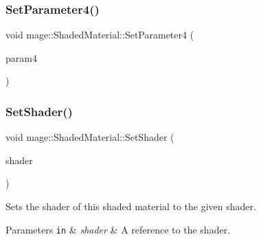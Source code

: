 \hypertarget{structmage_1_1_shaded_material_ac96ba1f979b75f973f3500f4cbd7e683}{}\label{structmage_1_1_shaded_material_ac96ba1f979b75f973f3500f4cbd7e683} 
\subsubsection{\texorpdfstring{Set\+Parameter4()}{SetParameter4()}}
{\footnotesize\ttfamily void mage\+::\+Shaded\+Material\+::\+Set\+Parameter4 (\begin{DoxyParamCaption}\item[{float}]{param4 }\end{DoxyParamCaption})\hspace{0.3cm}{\ttfamily [noexcept]}}

\hypertarget{structmage_1_1_shaded_material_a65646872fce0961e7ac346be162e89ec}{}\label{structmage_1_1_shaded_material_a65646872fce0961e7ac346be162e89ec} 
\subsubsection{\texorpdfstring{Set\+Shader()}{SetShader()}}
{\footnotesize\ttfamily void mage\+::\+Shaded\+Material\+::\+Set\+Shader (\begin{DoxyParamCaption}\item[{const \hyperlink{structmage_1_1_combined_shader}{Combined\+Shader} \&}]{shader }\end{DoxyParamCaption})}

Sets the shader of this shaded material to the given shader.


\begin{DoxyParams}[1]{Parameters}
\mbox{\tt in}  & {\em shader} & A reference to the shader. \\
\hline
\end{DoxyParams}
\hypertarget{structmage_1_1_shaded_material_ae9c4286f2802a30698863c9abe95e60d}{}\label{structmage_1_1_shaded_material_ae9c4286f2802a30698863c9abe95e60d} 
